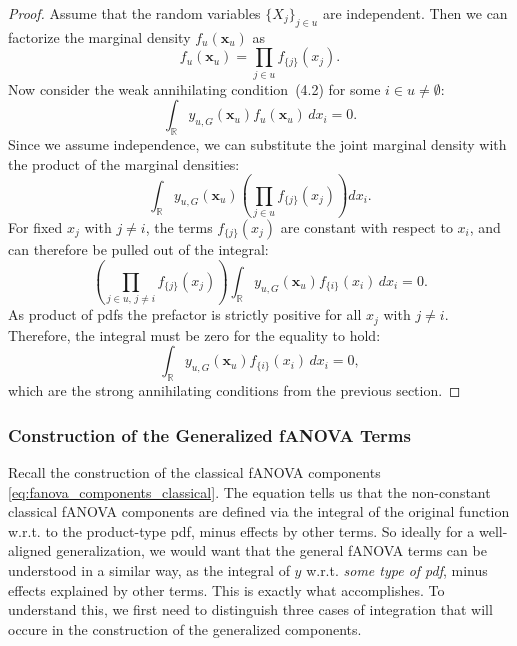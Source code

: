 \begin{proof}
Assume that the random variables $\{X_j\}_{j \in u}$ are independent. Then we can factorize the marginal density $f_u(\mathbf{x}_u)$ as
\[
f_u(\mathbf{x}_u) = \prod_{j \in u} f_{\{j\}}(x_j).
\]
Now consider the weak annihilating condition~(4.2) for some $i \in u \neq \emptyset$:
\[
\int_{\mathbb{R}} y_{u,G}(\mathbf{x}_u) f_u(\mathbf{x}_u) \, dx_i = 0.
\]
Since we assume independence, we can substitute the joint marginal density with the product of the marginal densities:
\[
\int_{\mathbb{R}} y_{u,G}(\mathbf{x}_u) \left( \prod_{j \in u} f_{\{j\}}(x_j) \right) dx_i.
\]
For fixed $x_j$ with $j \ne i$, the terms $f_{\{j\}}(x_j)$ are constant with respect to $x_i$, and can therefore be pulled out of the integral:
\[
\left( \prod_{j \in u,\, j \ne i} f_{\{j\}}(x_j) \right) \int_{\mathbb{R}} y_{u,G}(\mathbf{x}_u) f_{\{i\}}(x_i) \, dx_i = 0.
\]
As product of pdfs the prefactor is strictly positive for all $x_j$ with $j \ne i$. Therefore, the integral must be zero for the equality to hold:
\[
\int_{\mathbb{R}} y_{u,G}(\mathbf{x}_u) f_{\{i\}}(x_i) \, dx_i = 0,
\]
which are the strong annihilating conditions from the previous section.
\end{proof}


\subsubsection*{Construction of the Generalized fANOVA Terms}
Recall the construction of the classical fANOVA components \autoref{eq:fanova_components_classical}. The equation tells us that the non-constant classical fANOVA components are defined via the integral of the original function w.r.t. to the product-type pdf, minus effects by other terms. So ideally for a well-aligned generalization, we would want that the general fANOVA terms can be understood in a similar way, as the integral of $y$ w.r.t. \textit{some type of pdf}, minus effects explained by other terms.
This is exactly what \cite{rahman2014} accomplishes.
To understand this, we first need to distinguish three cases of integration that will occure in the construction of the generalized components.


